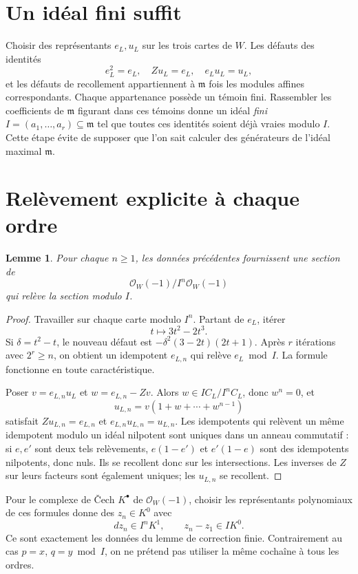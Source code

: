 \documentclass[11pt]{amsart}
\newtheorem{lemma}{Lemme}
\newcommand{\OO}{\mathcal O}
\newcommand{\m}{\mathfrak m}
\begin{document}
\section{Un idéal fini suffit}

Choisir des représentants $e_L,u_L$ sur les trois cartes de $W$.
Les défauts des identités
\[
 e_L^2=e_L,\quad Zu_L=e_L,\quad e_Lu_L=u_L,
\]
et les défauts de recollement appartiennent à $\m$ fois les modules
affines correspondants. Chaque appartenance possède un témoin fini.
Rassembler les coefficients de $\m$ figurant dans ces témoins donne
un idéal \emph{fini} $I=(a_1,\ldots,a_r)\subseteq\m$ tel que toutes
ces identités soient déjà vraies modulo $I$.
Cette étape évite de supposer que l'on sait calculer des générateurs
de l'idéal maximal $\m$.

\section{Relèvement explicite à chaque ordre}

\begin{lemma}\label{nilpotent}
Pour chaque $n\geq1$, les données précédentes fournissent une section de
\[
 \OO_W(-1)/I^n\OO_W(-1)
\]
qui relève la section modulo $I$.
\end{lemma}
\begin{proof}
Travailler sur chaque carte modulo $I^n$.
Partant de $e_L$, itérer
\[
 t\longmapsto 3t^2-2t^3.
\]
Si $\delta=t^2-t$, le nouveau défaut est
$-\delta^2(3-2t)(2t+1)$. Après $r$ itérations avec $2^r\geq n$,
on obtient un idempotent $e_{L,n}$ qui relève $e_L\bmod I$.
La formule fonctionne en toute caractéristique.

Poser $v=e_{L,n}u_L$ et $w=e_{L,n}-Zv$. Alors $w\in I C_L/I^nC_L$,
donc $w^n=0$, et
\[
 u_{L,n}=v(1+w+\cdots+w^{n-1})
\]
satisfait $Zu_{L,n}=e_{L,n}$ et $e_{L,n}u_{L,n}=u_{L,n}$.
Les idempotents qui relèvent un même idempotent modulo un idéal
nilpotent sont uniques dans un anneau commutatif : si $e,e'$ sont
deux tels relèvements, $e(1-e')$ et $e'(1-e)$ sont des idempotents
nilpotents, donc nuls. Ils se recollent donc sur les intersections.
Les inverses de $Z$ sur leurs facteurs sont également uniques;
les $u_{L,n}$ se recollent.
\end{proof}

Pour le complexe de Čech $K^\bullet$ de $\OO_W(-1)$, choisir les
représentants polynomiaux de ces formules donne des $z_n\in K^0$ avec
\[
 dz_n\in I^nK^1,\qquad z_n-z_1\in IK^0.
\]
Ce sont exactement les données du lemme de correction finie.
Contrairement au cas $p=x$, $q=y\bmod I$, on ne prétend pas utiliser
la même cochaîne à tous les ordres.
\end{document}
